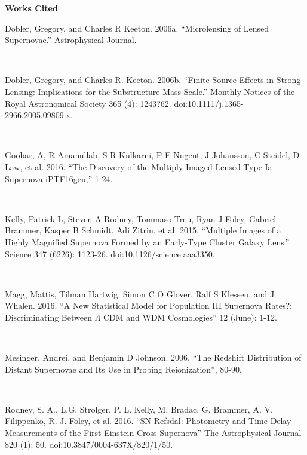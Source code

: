 \textbf{Works Cited}

Dobler, Gregory, and Charles R Keeton. 2006a. ``Microlensing of Lensed Supernovae.'' Astrophysical Journal.

\

Dobler, Gregory, and Charles R. Keeton. 2006b. ``Finite Source Effects in Strong Lensing: Implications for the Substructure Mass Scale.'' Monthly Notices of the Royal Astronomical Society 365 (4): 1243?62. doi:10.1111/j.1365-2966.2005.09809.x.

\

Goobar, A, R Amanullah, S R Kulkarni, P E Nugent, J Johansson, C Steidel, D Law, et al. 2016. ``The Discovery of the Multiply-Imaged Lensed Type Ia Supernova iPTF16geu,'' 1-24.

\

Kelly, Patrick L, Steven A Rodney, Tommaso Treu, Ryan J Foley, Gabriel Brammer, Kasper B Schmidt, Adi Zitrin, et al. 2015. ``Multiple Images of a Highly Magnified Supernova Formed by an Early-Type Cluster Galaxy Lens.'' Science 347 (6226): 1123-26. doi:10.1126/science.aaa3350.

\

Magg, Mattis, Tilman Hartwig, Simon C O Glover, Ralf S Klessen, and J Whalen. 2016. ``A New Statistical Model for Population III Supernova Rates?: Discriminating Between $\Lambda$ CDM and WDM Cosmologies'' 12 (June): 1-12.

\

Mesinger, Andrei, and Benjamin D Johnson. 2006. ``The Redshift Distribution of Distant Supernovae and Its Use in Probing Reionization'', 80-90.

\

Rodney, S. A., L.G. Strolger, P. L. Kelly, M. Bradac, G. Brammer, A. V. Filippenko, R. J. Foley, et al. 2016. ``SN Refsdal: Photometry and Time Delay Measurements of the First Einstein Cross Supernova'' The Astrophysical Journal 820 (1): 50. doi:10.3847/0004-637X/820/1/50.








